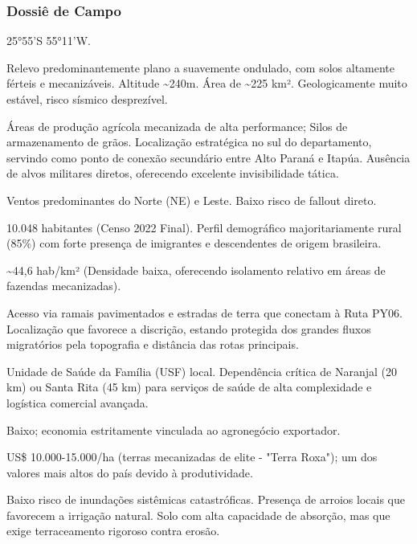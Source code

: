 \subsubsection{Dossiê de Campo}
\begin{description}[style=nextline,leftmargin=0.5cm,font=\bfseries]
\item[Coordenadas]  25°55'S 55°11'W.
\item[Topografia]  Relevo predominantemente plano a suavemente ondulado, com solos altamente férteis e mecanizáveis. Altitude \textasciitilde 240m. Área de \textasciitilde 225 km². Geologicamente muito estável, risco sísmico desprezível.
\item[Alvos Estratégicos]  Áreas de produção agrícola mecanizada de alta performance; Silos de armazenamento de grãos. Localização estratégica no sul do departamento, servindo como ponto de conexão secundário entre Alto Paraná e Itapúa. Ausência de alvos militares diretos, oferecendo excelente invisibilidade tática.
\item[Fallout]  Ventos predominantes do Norte (NE) e Leste. Baixo risco de fallout direto.
\item[População]  10.048 habitantes (Censo 2022 Final). Perfil demográfico majoritariamente rural (85\%) com forte presença de imigrantes e descendentes de origem brasileira.
\item[Densidade]  \textasciitilde 44,6 hab/\allowbreak km² (Densidade baixa, oferecendo isolamento relativo em áreas de fazendas mecanizadas).
\item[Vias de Acesso]  Acesso via ramais pavimentados e estradas de terra que conectam à Ruta PY06. Localização que favorece a discrição, estando protegida dos grandes fluxos migratórios pela topografia e distância das rotas principais.
\item[Serviços]  Unidade de Saúde da Família (USF) local. Dependência crítica de Naranjal (20 km) ou Santa Rita (45 km) para serviços de saúde de alta complexidade e logística comercial avançada.
\item[Custo de Vida]  Baixo; economia estritamente vinculada ao agronegócio exportador.
\item[Preço da Terra]  US\$ 10.000-15.000/\allowbreak ha (terras mecanizadas de elite - "Terra Roxa"); um dos valores mais altos do país devido à produtividade.
\item[Hidrologia]  Baixo risco de inundações sistêmicas catastróficas. Presença de arroios locais que favorecem a irrigação natural. Solo com alta capacidade de absorção, mas que exige terraceamento rigoroso contra erosão.

\end{description}
